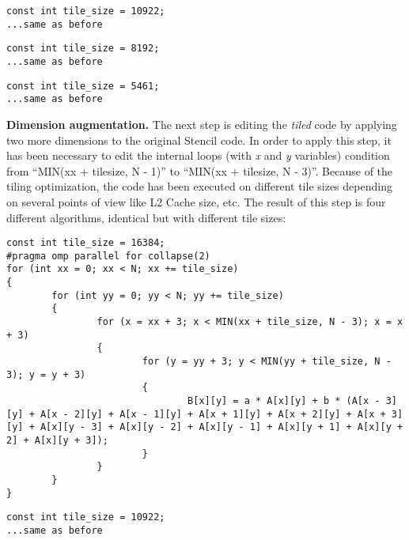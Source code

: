 \documentclass[conference]{IEEEtran}
\newcommand{\mypar}[1]{{\bf #1.}}
\begin{document}
\begin{lstlisting}[caption={Loop tiling with size of 10922},label={lst:tiling-2}]
const int tile_size = 10922;
...same as before
\end{lstlisting}

\begin{lstlisting}[caption={Loop tiling with size of 8192},label={lst:tiling-3}]
const int tile_size = 8192;
...same as before
\end{lstlisting} 

\begin{lstlisting}[caption={Loop tiling with size of 5461},label={lst:tiling-4}]
const int tile_size = 5461;
...same as before
\end{lstlisting}

\mypar{Dimension augmentation}
The next step is editing the \textit{tiled} code by applying two more dimensions to the original Stencil code. In order to apply this step, it has been necessary to edit the internal loops (with \textit{x} and \textit{y} variables) condition from ``MIN(xx + tile\textunderscore size, N - 1)'' to ``MIN(xx + tile\textunderscore size, N - 3)''. Because of the tiling optimization, the code has been executed on different tile sizes depending on several points of view like L2 Cache size, etc. The result of this step is four different algorithms, identical but with different tile sizes:

\renewcommand{\lstlistingname}{Algorithm}

\begin{lstlisting}[caption={Dimension augmentation + loop tiling with size of 16384},label={lst:augmentation-1}]
const int tile_size = 16384;
#pragma omp parallel for collapse(2)
for (int xx = 0; xx < N; xx += tile_size)
{
		for (int yy = 0; yy < N; yy += tile_size)
		{
				for (x = xx + 3; x < MIN(xx + tile_size, N - 3); x = x + 3)
				{
						for (y = yy + 3; y < MIN(yy + tile_size, N - 3); y = y + 3)
						{
								B[x][y] = a * A[x][y] + b * (A[x - 3][y] + A[x - 2][y] + A[x - 1][y] + A[x + 1][y] + A[x + 2][y] + A[x + 3][y] + A[x][y - 3] + A[x][y - 2] + A[x][y - 1] + A[x][y + 1] + A[x][y + 2] + A[x][y + 3]);
						}
				}
		}
}
\end{lstlisting}

\begin{lstlisting}[caption={Dimension augmentation + loop tiling with size of 10922},label={lst:augmentation-2}]
const int tile_size = 10922;
...same as before
\end{lstlisting}
\end{document}
